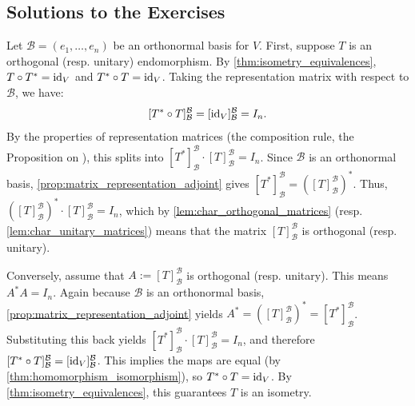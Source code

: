 \subsection{Solutions to the Exercises}
\label{sec:solutions_isometries}

\begin{exercisesolution}
\label{sol:orth_unitary_matrix_rep}
Let $\mathcal{B} = (e_1, \dots, e_n)$ be an orthonormal basis for $V$. 
First, suppose $T$ is an orthogonal (resp. unitary) endomorphism. By \cref{thm:isometry_equivalences}, $T \circ T^* = \operatorname{id}_V$ and $T^* \circ T = \operatorname{id}_V$. 
Taking the representation matrix with respect to $\mathcal{B}$, we have:
\[ [T^* \circ T]_{\mathcal{B}}^{\mathcal{B}} = [\operatorname{id}_V]_{\mathcal{B}}^{\mathcal{B}} = I_n. \]
By the properties of representation matrices (the composition rule, the Proposition on ), this splits into $[T^*]_{\mathcal{B}}^{\mathcal{B}} \cdot [T]_{\mathcal{B}}^{\mathcal{B}} = I_n$. Since $\mathcal{B}$ is an orthonormal basis, \cref{prop:matrix_representation_adjoint} gives $[T^*]_{\mathcal{B}}^{\mathcal{B}} = \left([T]_{\mathcal{B}}^{\mathcal{B}}\right)^*$. 
Thus, $\left([T]_{\mathcal{B}}^{\mathcal{B}}\right)^* \cdot [T]_{\mathcal{B}}^{\mathcal{B}} = I_n$, which by \cref{lem:char_orthogonal_matrices} (resp. \cref{lem:char_unitary_matrices}) means that the matrix $[T]_{\mathcal{B}}^{\mathcal{B}}$ is orthogonal (resp. unitary).

Conversely, assume that $A := [T]_{\mathcal{B}}^{\mathcal{B}}$ is orthogonal (resp. unitary). This means $A^* A = I_n$. 
Again because $\mathcal{B}$ is an orthonormal basis, \cref{prop:matrix_representation_adjoint} yields $A^* = \left([T]_{\mathcal{B}}^{\mathcal{B}}\right)^* = [T^*]_{\mathcal{B}}^{\mathcal{B}}$. 
Substituting this back yields $[T^*]_{\mathcal{B}}^{\mathcal{B}} \cdot [T]_{\mathcal{B}}^{\mathcal{B}} = I_n$, and therefore $[T^* \circ T]_{\mathcal{B}}^{\mathcal{B}} = [\operatorname{id}_V]_{\mathcal{B}}^{\mathcal{B}}$. This implies the maps are equal (by \cref{thm:homomorphism_isomorphism}), so $T^* \circ T = \operatorname{id}_V$. By \cref{thm:isometry_equivalences}, this guarantees $T$ is an isometry.
\end{exercisesolution}

